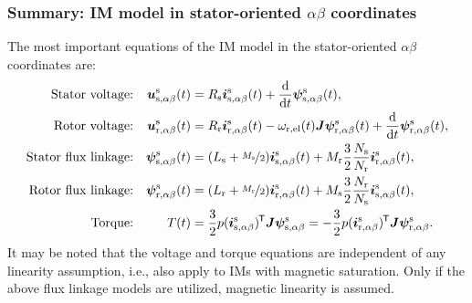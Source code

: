 \begin{frame}
	\frametitle{Summary: IM model in stator-oriented $\alpha\beta$ coordinates}
	The most important equations of the IM model in the stator-oriented $\alpha\beta$ coordinates are:
	\begin{equation*}
		\begin{alignedat}{4}
			 &  & \mbox{Stator voltage:}      &  & \quad\bm{u}^\mathrm{s}_\mathrm{s,\alpha\beta}(     & t) &  & = R_\mathrm{s} \bm{i}^\mathrm{s}_\mathrm{s,\alpha\beta}(t)+ \frac{\mathrm{d}}{\mathrm{d}t}\bm{\psi}^\mathrm{s}_\mathrm{s,\alpha\beta}(t),                                                                                   \\
			 &  & \mbox{Rotor voltage:}       &  & \quad\bm{u}^\mathrm{s}_\mathrm{r,\alpha\beta}(     & t) &  & = R_\mathrm{r} \bm{i}^\mathrm{s}_\mathrm{r,\alpha\beta}(t)-\omega_\mathrm{r,el}(t)\bm{J}\bm{\psi}^\mathrm{s}_\mathrm{r,\alpha\beta}(t) +\frac{\mathrm{d}}{\mathrm{d}t}\bm{\psi}^\mathrm{s}_\mathrm{r,\alpha\beta}(t),       \\
			 &  & \mbox{Stator flux linkage:} &  & \quad \bm{\psi}^\mathrm{s}_\mathrm{s,\alpha\beta}( & t) &  & = (L_\mathrm{s} +\nicefrac{M_\mathrm{s}}{2}) \bm{i}^\mathrm{s}_{\mathrm{s},\alpha\beta}(t) +  M_{\mathrm{r}}\frac{3}{2}\frac{N_\mathrm{s}}{N_\mathrm{r}} \bm{i}^\mathrm{s}_{\mathrm{r},\alpha\beta}(t),                     \\
			 &  & \mbox{Rotor flux linkage:}  &  & \quad \bm{\psi}^\mathrm{s}_\mathrm{r,\alpha\beta}( & t) &  & = (L_\mathrm{r} +\nicefrac{M_\mathrm{r}}{2}) \bm{i}^\mathrm{s}_{\mathrm{r},\alpha\beta}(t) +  M_{\mathrm{s}}\frac{3}{2}\frac{N_\mathrm{r}}{N_\mathrm{s}} \bm{i}^\mathrm{s}_{\mathrm{s},\alpha\beta}(t),                     \\
			 &  & \mbox{Torque:}              &  & \quad T(                                           & t) &  & = \frac{3}{2} p (\bm{i}_\mathrm{s,\alpha\beta}^\mathrm{s})^{\mkern-1.5mu\mathsf{T}}\bm{J}\bm{\psi}_\mathrm{s,\alpha\beta}^\mathrm{s}=-\frac{3}{2} p (\bm{i}^\mathrm{s}_\mathrm{r,\alpha\beta})^{\mkern-1.5mu\mathsf{T}}\bm{J}\bm{\psi}^\mathrm{s}_\mathrm{r,\alpha\beta}.
		\end{alignedat}
	\end{equation*}
	\pause
	It may be noted that the voltage and torque equations are independent of any linearity assumption, i.e., also apply to IMs with magnetic saturation. Only if the above flux linkage models are utilized, magnetic linearity is assumed.
\end{frame}

